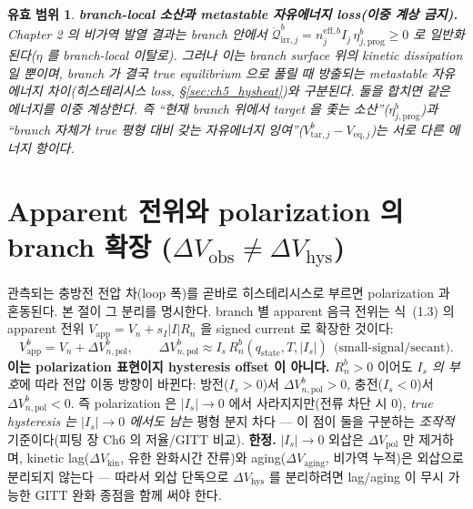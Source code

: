 \documentclass[11pt,a4paper]{article}
\newtheorem*{boundbox}{유효 범위}
\newcommand{\eff}{\mathrm{eff}}
\newcommand{\eq}{\mathrm{eq}}
\newcommand{\app}{\mathrm{app}}
\newcommand{\irr}{\mathrm{irr}}
\newcommand{\hys}{\mathrm{hys}}
\newcommand{\pol}{\mathrm{pol}}
\newcommand{\kin}{\mathrm{kin}}
\newcommand{\obs}{\mathrm{obs}}
\newcommand{\tar}{\mathrm{tar}}
\newcommand{\stt}{\mathrm{state}}
\newcommand{\prog}{\mathrm{prog}}
\begin{document}
\begin{boundbox}
\textbf{branch-local 소산과 metastable 자유에너지 loss(이중 계상 금지).} Chapter 2 의 비가역 발열 결과는 branch
안에서 $\dot{\mathcal Q}_{\irr,j}^b=n_j^{\eff,b}I_j\,\eta_{j,\prog}^b\ge0$ 로 일반화된다($\eta$ 를 branch-local
이탈로). 그러나 이는 branch surface 위의 kinetic dissipation 일 뿐이며, branch 가 결국 true equilibrium 으로 풀릴
때 방출되는 metastable 자유에너지 차이(히스테리시스 loss, \S\ref{sec:ch5_hysheat})와 \emph{구분}된다. 둘을 합치면
같은 에너지를 이중 계상한다. 즉 ``현재 branch 위에서 target 을 좇는 소산''($\eta_{j,\prog}^b$)과 ``branch 자체가
true 평형 대비 갖는 자유에너지 잉여''($V_{\tar,j}^b-V_{\eq,j}$)는 서로 다른 에너지 항이다.
\end{boundbox}

\section{Apparent 전위와 polarization 의 branch 확장 ($\Delta V_\obs\ne\Delta V_\hys$)}\label{sec:ch5_apparent}
관측되는 충방전 전압 차(loop 폭)를 곧바로 히스테리시스로 부르면 polarization 과 혼동된다. 본 절이 그 분리를
명시한다. branch 별 apparent 음극 전위는 식~(1.3) 의 apparent 전위 $V_\app=V_n+s_I|I|R_n$ 을 signed current 로
확장한 것이다:
\begin{equation}
V_\app^b=V_n+\Delta V_{n,\pol}^b,\qquad
\Delta V_{n,\pol}^b\approx I_s\,R_n^b(q_\stt,T,|I_s|)\ \ \text{(small-signal/secant)}.
\label{eq:ch5_vapp_branch}
\end{equation}
\textbf{이는 polarization 표현이지 hysteresis offset 이 아니다.} $R_n^b>0$ 이어도 \emph{$I_s$ 의 부호}에 따라
전압 이동 방향이 바뀐다: 방전($I_s>0$)서 $\Delta V_{n,\pol}^b>0$, 충전($I_s<0$)서 $\Delta V_{n,\pol}^b<0$. 즉
polarization 은 $|I_s|\to0$ 에서 사라지지만(전류 차단 시 0), \emph{true hysteresis 는 $|I_s|\to0$ 에서도 남는}
평형 분지 차다 — 이 점이 둘을 구분하는 \emph{조작적} 기준이다(피팅 장 Ch6 의 저율/GITT 비교).
\textbf{한정.} $|I_s|\to0$ 외삽은 $\Delta V_\pol$ 만 제거하며, kinetic lag($\Delta V_\kin$, 유한 완화시간
잔류)와 aging($\Delta V_{\mathrm{aging}}$, 비가역 누적)은 외삽으로 분리되지 않는다 — 따라서 외삽 단독으로
$\Delta V_\hys$ 를 분리하려면 lag/aging 이 무시 가능한 GITT 완화 종점을 함께 써야 한다.
\end{document}
